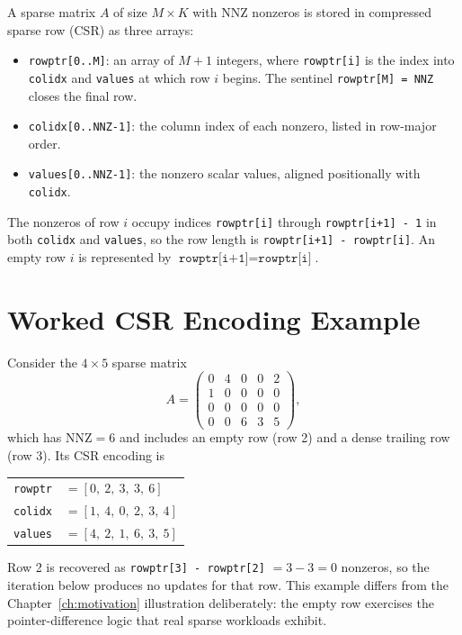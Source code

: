 \documentclass[oneside]{ecsproject}    %
\begin{document}
A sparse matrix $A$ of size $M \times K$ with $\mathrm{NNZ}$ nonzeros is stored
in compressed sparse row (CSR) as three arrays:
\begin{itemize}
  \item \texttt{rowptr[0..M]}: an array of $M + 1$ integers, where
        \texttt{rowptr[i]} is the index into \texttt{colidx} and \texttt{values}
        at which row $i$ begins. The sentinel \texttt{rowptr[M] = NNZ} closes
        the final row.
  \item \texttt{colidx[0..NNZ-1]}: the column index of each nonzero, listed in
        row-major order.
  \item \texttt{values[0..NNZ-1]}: the nonzero scalar values, aligned
        positionally with \texttt{colidx}.
\end{itemize}
The nonzeros of row $i$ occupy indices \texttt{rowptr[i]} through
\texttt{rowptr[i+1] - 1} in both \texttt{colidx} and \texttt{values}, so
the row length is \texttt{rowptr[i+1] - rowptr[i]}. An empty row $i$ is
represented by $\texttt{rowptr[i+1]} = \texttt{rowptr[i]}$.

\section{Worked CSR Encoding Example}
\label{app:csr-example}

Consider the $4 \times 5$ sparse matrix
\[
  A = \begin{pmatrix}
        0 & 4 & 0 & 0 & 2 \\
        1 & 0 & 0 & 0 & 0 \\
        0 & 0 & 0 & 0 & 0 \\
        0 & 0 & 6 & 3 & 5
      \end{pmatrix},
\]
which has $\mathrm{NNZ} = 6$ and includes an empty row (row 2) and a dense
trailing row (row 3). Its CSR encoding is
\begin{center}
\begin{tabular}{ll}
  \texttt{rowptr} & $= [0,\ 2,\ 3,\ 3,\ 6]$ \\
  \texttt{colidx} & $= [1,\ 4,\ 0,\ 2,\ 3,\ 4]$ \\
  \texttt{values} & $= [4,\ 2,\ 1,\ 6,\ 3,\ 5]$
\end{tabular}
\end{center}
Row 2 is recovered as \texttt{rowptr[3] - rowptr[2]} $= 3 - 3 = 0$ nonzeros,
so the iteration below produces no updates for that row. This example differs
from the Chapter~\ref{ch:motivation} illustration deliberately: the empty row
exercises the pointer-difference logic that real sparse workloads exhibit.
\end{document}
